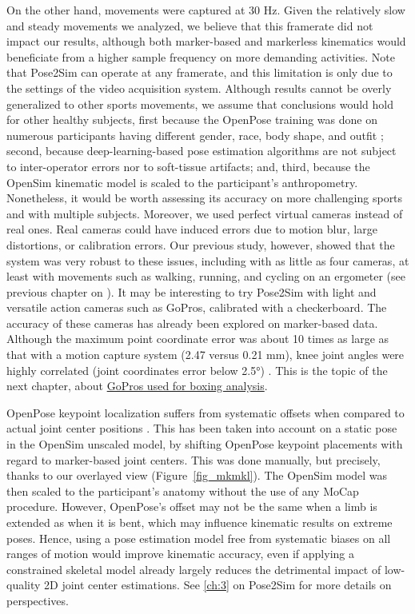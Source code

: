 On the other hand, movements were captured at 30 Hz. Given the relatively slow and steady movements we analyzed, we believe that this framerate did not impact our results, although both marker-based and markerless kinematics would beneficiate from a higher sample frequency on more demanding activities. Note that Pose2Sim can operate at any framerate, and this limitation is only due to the settings of the video acquisition system. Although results cannot be overly generalized to other sports movements, we assume that conclusions would hold for other healthy subjects, first because the OpenPose training was done on numerous participants having different gender, race, body shape, and outfit \cite{Andriluka2014,Lin2014,Xiang2019}; second, because deep-learning-based pose estimation algorithms are not subject to inter-operator errors nor to soft-tissue artifacts; and, third, because the OpenSim kinematic model is scaled to the participant’s anthropometry. Nonetheless, it would be worth assessing its accuracy on more challenging sports and with multiple subjects. Moreover, we used perfect virtual cameras instead of real ones. Real cameras could have induced errors due to motion blur, large distortions, or calibration errors. Our previous study, however, showed that the system was very robust to these issues, including with as little as four cameras, at least with movements such as walking, running, and cycling on an ergometer (see previous chapter on  \cite{Pagnon2021}). It may be interesting to try Pose2Sim with light and versatile action cameras such as GoPros, calibrated with a checkerboard. The accuracy of these cameras has already been explored on marker-based data. Although the maximum point coordinate error was about 10 times as large as that with a motion capture system (2.47 versus 0.21 mm), knee joint angles were highly correlated (joint coordinates error below 2.5°) \cite{Dalla2019}. This is the topic of the next chapter, about \hyperref[ch:6]{GoPros used for boxing analysis}.

OpenPose keypoint localization suffers from systematic offsets when compared to actual joint center positions \cite{Needham2021b}. This has been taken into account on a static pose in the OpenSim unscaled model, by shifting OpenPose keypoint placements with regard to marker-based joint centers. This was done manually, but precisely, thanks to our overlayed view (Figure~\ref{fig_mkmkl}). The OpenSim model was then scaled to the participant’s anatomy without the use of any MoCap procedure. However, OpenPose’s offset may not be the same when a limb is extended as when it is bent, which may influence kinematic results on extreme poses. Hence, using a pose estimation model free from systematic biases on all ranges of motion would improve kinematic accuracy, even if applying a constrained skeletal model already largely reduces the detrimental impact of low-quality 2D joint center estimations. See \autoref{ch:3} on Pose2Sim for more details on perspectives.


